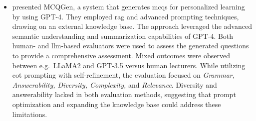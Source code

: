 \begin{itemize}
    \item \cite{hang_mcqgen_2024} presented MCQGen, a system that generates \ac{mcqs} for personalized learning by using GPT-4. They employed \ac{rag} and advanced prompting techniques, drawing on an external knowledge base. The approach leveraged the advanced semantic understanding and summarization capabilities of GPT-4. Both human- and \ac{llm}-based evaluators were used to assess the generated questions to provide a comprehensive assessment. Mixed outcomes were observed between e.g.\ LLaMA2 and GPT-3.5 versus human lecturers. While utilizing \ac{cot} prompting with self-refinement, the evaluation focused on \textit{Grammar, Answerability, Diversity, Complexity,} and \textit{Relevance}. Diversity and answerability lacked in both evaluation methods, suggesting that prompt optimization and expanding the knowledge base could address these limitations. 
\end{itemize}

\vspace{3em}\pagebreak

